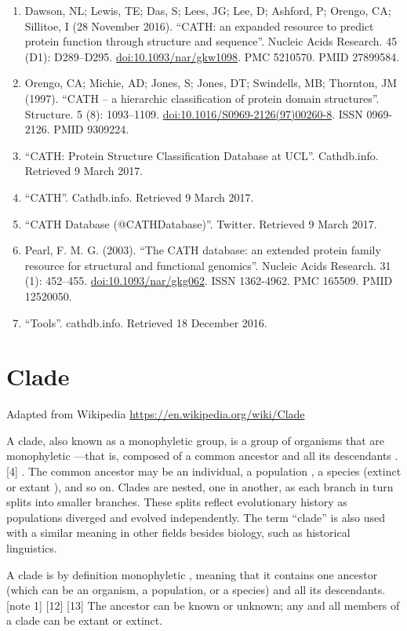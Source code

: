 \documentclass[
]{book}
\providecommand{\tightlist}{%
  \setlength{\itemsep}{0pt}\setlength{\parskip}{0pt}}
\begin{document}
\begin{enumerate}
\def\labelenumi{\arabic{enumi}.}
\tightlist
\item
  Dawson, NL; Lewis, TE; Das, S; Lees, JG; Lee, D; Ashford, P; Orengo, CA; Sillitoe, I (28 November 2016). ``CATH: an expanded resource to predict protein function through structure and sequence''. Nucleic Acids Research. 45 (D1): D289--D295. \url{doi:10.1093/nar/gkw1098}. PMC 5210570. PMID 27899584.
\item
  Orengo, CA; Michie, AD; Jones, S; Jones, DT; Swindells, MB; Thornton, JM (1997). ``CATH -- a hierarchic classification of protein domain structures''. Structure. 5 (8): 1093--1109. \url{doi:10.1016/S0969-2126(97)00260-8}. ISSN 0969-2126. PMID 9309224.
\item
  ``CATH: Protein Structure Classification Database at UCL''. Cathdb.info. Retrieved 9 March 2017.
\item
  ``CATH''. Cathdb.info. Retrieved 9 March 2017.
\item
  ``CATH Database (@CATHDatabase)''. Twitter. Retrieved 9 March 2017.
\item
  Pearl, F. M. G. (2003). ``The CATH database: an extended protein family resource for structural and functional genomics''. Nucleic Acids Research. 31 (1): 452--455. \url{doi:10.1093/nar/gkg062}. ISSN 1362-4962. PMC 165509. PMID 12520050.
\item
  ``Tools''. cathdb.info. Retrieved 18 December 2016.
\end{enumerate}

\hypertarget{clade}{%
\section{Clade}\label{clade}}

Adapted from Wikipedia
\url{https://en.wikipedia.org/wiki/Clade}

A clade, also known as a monophyletic group, is a group of organisms that are monophyletic ---that is, composed of a common ancestor and all its descendants .{[}4{]} . The common ancestor may be an individual, a population , a species (extinct or extant ), and so on. Clades are nested, one in another, as each branch in turn splits into smaller branches. These splits reflect evolutionary history as populations diverged and evolved independently. The term ``clade'' is also used with a similar meaning in other fields besides biology, such as historical linguistics.

A clade is by definition monophyletic , meaning that it contains one ancestor (which can be an organism, a population, or a species) and all its descendants.{[}note 1{]} {[}12{]} {[}13{]} The ancestor can be known or unknown; any and all members of a clade can be extant or extinct.
\end{document}
